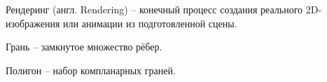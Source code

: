 
Рендеринг (англ. Rendering) -- конечный процесс создания реального 2D-изображения или анимации из подготовленной сцены.

Грань -- замкнутое множество рёбер.

Полигон -- набор компланарных граней.

\clearpage
